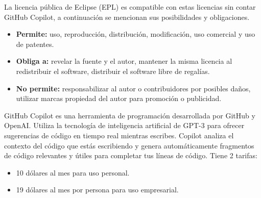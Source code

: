La licencia pública de Eclipse (EPL) es compatible con estas licencias sin contar GitHub Copilot, a continuación se mencionan sus posibilidades y obligaciones.
\begin{itemize}
	\item\textbf{Permite:} uso, reproducción, distribución, modificación, uso comercial y uso de patentes.
	\item\textbf{Obliga a:} revelar la fuente y el autor, mantener la misma licencia al redistribuir el software, distribuir el software libre de regalías.
	\item\textbf{No permite:} responsabilizar al autor o contribuidores por posibles daños, utilizar marcas propiedad del autor para promoción o publicidad.
\end{itemize}

GitHub Copilot es una herramienta de programación desarrollada por GitHub y OpenAI. Utiliza la tecnología de inteligencia artificial de GPT-3 para ofrecer sugerencias de código en tiempo real mientras escribes. Copilot analiza el contexto del código que estás escribiendo y genera automáticamente fragmentos de código relevantes y útiles para completar tus líneas de código.
Tiene 2 tarifas:
\begin{itemize}
	\item 10 dólares al mes para uso personal.
	\item 19 dólares al mes por persona para uso empresarial.
\end{itemize}